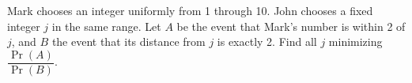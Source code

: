 Mark chooses an integer uniformly from 1 through 10. John chooses a fixed integer $j$ in the same range. Let $A$ be the event that Mark's number is within 2 of $j$, and $B$ the event that its distance from $j$ is exactly 2. Find all $j$ minimizing $\dfrac{\Pr(A)}{\Pr(B)}$.
